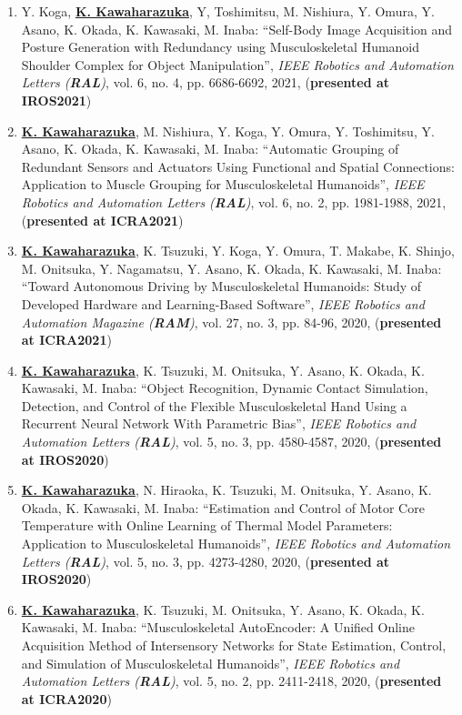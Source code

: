 \documentclass[letterpaper]{article}
\begin{document}
\begin{enumerate}
\item Y. Koga, \underline{\textbf{K. Kawaharazuka}}, Y, Toshimitsu, M. Nishiura, Y. Omura, Y. Asano, K. Okada, K. Kawasaki, M. Inaba: ``Self-Body Image Acquisition and Posture Generation with Redundancy using Musculoskeletal Humanoid Shoulder Complex for Object Manipulation'', \textit{IEEE Robotics and Automation Letters (\textit{\textbf{RAL}})}, vol. 6, no. 4, pp. 6686-6692, 2021, (\textbf{presented at IROS2021})
\item \underline{\textbf{K. Kawaharazuka}}, M. Nishiura, Y. Koga, Y. Omura, Y. Toshimitsu, Y. Asano, K. Okada, K. Kawasaki, M. Inaba: ``Automatic Grouping of Redundant Sensors and Actuators Using Functional and Spatial Connections: Application to Muscle Grouping for Musculoskeletal Humanoids'', \textit{IEEE Robotics and Automation Letters (\textit{\textbf{RAL}})}, vol. 6, no. 2, pp. 1981-1988, 2021, (\textbf{presented at ICRA2021})
\item \underline{\textbf{K. Kawaharazuka}}, K. Tsuzuki, Y. Koga, Y. Omura, T. Makabe, K. Shinjo, M. Onitsuka, Y. Nagamatsu, Y. Asano, K. Okada, K. Kawasaki, M. Inaba: ``Toward Autonomous Driving by Musculoskeletal Humanoids: Study of Developed Hardware and Learning-Based Software'', \textit{IEEE Robotics and Automation Magazine (\textit{\textbf{RAM}})}, vol. 27, no. 3, pp. 84-96, 2020, (\textbf{presented at ICRA2021})
\item \underline{\textbf{K. Kawaharazuka}}, K. Tsuzuki, M. Onitsuka, Y. Asano, K. Okada, K. Kawasaki, M. Inaba: ``Object Recognition, Dynamic Contact Simulation, Detection, and Control of the Flexible Musculoskeletal Hand Using a Recurrent Neural Network With Parametric Bias'', \textit{IEEE Robotics and Automation Letters (\textit{\textbf{RAL}})}, vol. 5, no. 3, pp. 4580-4587, 2020, (\textbf{presented at IROS2020})
\item \underline{\textbf{K. Kawaharazuka}}, N. Hiraoka, K. Tsuzuki, M. Onitsuka, Y. Asano, K. Okada, K. Kawasaki, M. Inaba: ``Estimation and Control of Motor Core Temperature with Online Learning of Thermal Model Parameters: Application to Musculoskeletal Humanoids'', \textit{IEEE Robotics and Automation Letters (\textit{\textbf{RAL}})}, vol. 5, no. 3, pp. 4273-4280, 2020, (\textbf{presented at IROS2020})
\item \underline{\textbf{K. Kawaharazuka}}, K. Tsuzuki, M. Onitsuka, Y. Asano, K. Okada, K. Kawasaki, M. Inaba: ``Musculoskeletal AutoEncoder: A Unified Online Acquisition Method of Intersensory Networks for State Estimation, Control, and Simulation of Musculoskeletal Humanoids'', \textit{IEEE Robotics and Automation Letters (\textit{\textbf{RAL}})}, vol. 5, no. 2, pp. 2411-2418, 2020, (\textbf{presented at ICRA2020})

\end{enumerate}
\end{document}
